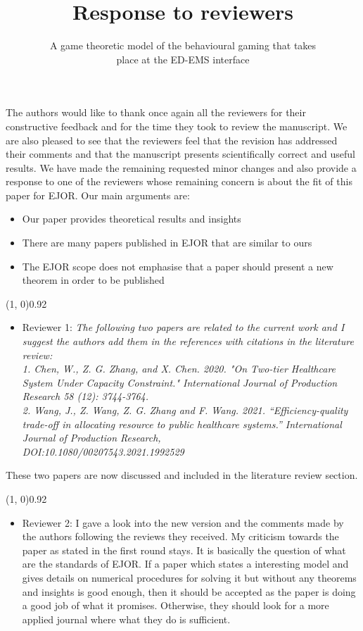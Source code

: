 \documentclass{article}
\title{Response to reviewers}
\author{A game theoretic model of the behavioural gaming that takes \\
place at the ED-EMS interface}
\begin{document}
    \maketitle

    The authors would like to thank once again all the reviewers for their
    constructive feedback and for
    the time they took to review the manuscript.
    We are also pleased to see that the reviewers feel that the revision has
    addressed their comments and that the manuscript presents scientifically
    correct and useful results.
    We have made the remaining requested minor changes and also provide a
    response to one of the reviewers whose remaining concern is about the fit
    of this paper for EJOR.
    Our main arguments are:
    \begin{itemize}
        \item Our paper provides theoretical results and insights
        \item There are many papers published in EJOR that are similar to ours
        \item The EJOR scope does not emphasise that a paper should present a
        new theorem in order to be published
    \end{itemize}


    \line(1, 0){0.92\textwidth}
    \begin{itemize}
        \item Reviewer 1: \textit{The following two papers are related to the
        current work and I suggest the authors add them in the references with
        citations in the literature review: \\
        1. Chen, W., Z. G. Zhang, and X. Chen. 2020. "On Two-tier Healthcare
        System Under Capacity Constraint." International Journal of Production
        Research 58 (12): 3744-3764. \\
        2. Wang, J., Z. Wang, Z. G. Zhang and F. Wang. 2021.
        ``Efficiency-quality trade-off in allocating resource to public
        healthcare systems.'' International Journal of Production Research, \\
        DOI:10.1080/00207543.2021.1992529}
    \end{itemize}

    These two papers are now discussed and included in the literature review
    section.

    \line(1, 0){0.92\textwidth}
    \begin{itemize}
        \item Reviewer 2: I gave a look into the new version and the comments
        made by the authors following the reviews they received.
        My criticism towards the paper as stated in the first round stays.
        It is basically the question of what are the standards of EJOR.
        If a paper which states a interesting model and gives details on
        numerical procedures for solving it but without any theorems and
        insights is good enough, then it should be accepted as the paper is
        doing a good job of what it promises.
        Otherwise, they should look for a more applied journal where what they
        do is sufficient.
    \end{itemize}
\end{document}
